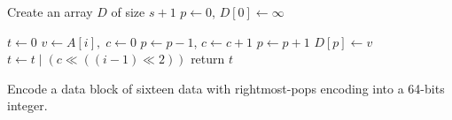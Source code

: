 \begin{algorithm}
\SetAlgoNoLine
{}

Create an array $D$ of size $s+1$ \;
$p \gets 0$, $D[0] \gets \infty$ \;

$t \gets 0$ \;
 {
  $v \gets A[i], \; c \gets 0$\;
   {
    $p \gets p - 1$, $c \gets c + 1$ \;
  }
  $p \gets p + 1$ \;
  $D[p] \gets v$ \;
  $t \gets t \mathrel{|} (c \ll ((i-1) \ll 2))$ \;
}
return $t$ \;

  \caption{Encode a data block of sixteen data with rightmost-pops
    encoding into a 64-bits integer.}
  \label{alg:cartesian-to-64bits}
\end{algorithm}
